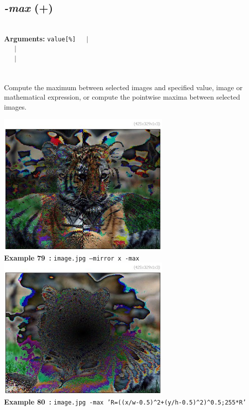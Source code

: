 \documentclass[a4paper,11pt,twoside]{book}
\begin{document}
\subsection{\emph{-max} (+)}\vspace*{-0.5em}
~\\\textbf{Arguments: } 
{\small \texttt{value[\%]}}~~~$|$\\
\hspace*{2.2cm}{\small \texttt{[image]}}~~~$|$\\
~~~$|$\\
\\~\\
Compute the maximum between selected images and specified value, image or
mathematical expression, or compute the pointwise maxima between selected images.
\begin{center}\includegraphics[keepaspectratio=true,height=7cm,width=\textwidth]{img/gmic_def79.jpg}\\
{\footnotesize \textbf{Example 79~:} \texttt{image.jpg --mirror x -max}}
\\\includegraphics[keepaspectratio=true,height=7cm,width=\textwidth]{img/gmic_def80.jpg}\\
{\footnotesize \textbf{Example 80~:} \texttt{image.jpg -max 'R=((x/w-0.5)\textasciicircum 2+(y/h-0.5)\textasciicircum 2)\textasciicircum 0.5;255*R'}}
\end{center}
\end{document}

